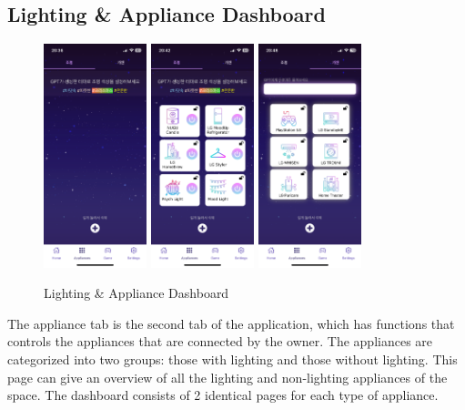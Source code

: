 \documentclass[conference]{IEEEtran}
\begin{document}
    \subsection{Lighting \& Appliance Dashboard}
        \begin{figure}[htbp]
            \centerline{\includegraphics[width=3cm]{Images/screen/light/1_LIGHT_EMPTY.PNG}
            \includegraphics[width=3cm]{Images/screen/light/5_LIGHT_FULL.PNG}
            \includegraphics[width=3cm]{Images/screen/elec/5_ELEC_FULL.PNG}}
            \caption{Lighting \& Appliance Dashboard}
            \label{fig}
        \end{figure} 
        The appliance tab is the second tab of the application, which has functions that controls the appliances that are connected by the owner. The appliances are categorized into two groups: those with lighting and those without lighting. This page can give an overview of all the lighting and non-lighting appliances of the space. The dashboard consists of 2 identical pages for each type of appliance.\\
\end{document}
